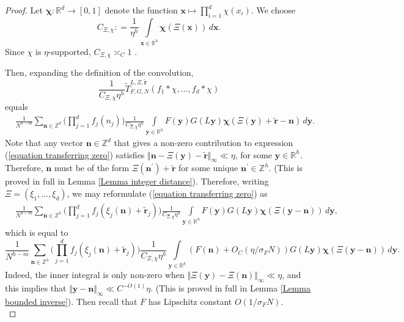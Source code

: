 \documentclass[12pt,a4paper,twoside,reqno]{amsart}
\newcommand{\bc}{\boldsymbol{\chi}}
\numberwithin{equation}{section}
\begin{document}
\begin{proof}
Let $\boldsymbol{\chi}:\mathbb{R}^d \longrightarrow [0,1]$ denote the function $\mathbf{x}\mapsto \prod\limits_{i=1}^d \chi(x_i)$. We choose \[ C_{\Xi,\chi} : = \frac{1}{\eta^h}\int\limits_{\mathbf{x} \in \mathbb{R}^h} \bc(\Xi(\mathbf{x})) \, d\mathbf{x} .\] Since $\chi$ is $\eta$-supported, $C_{\Xi,\chi} \asymp_C 1$ . 

Then, expanding the definition of the convolution, \[\frac{1}{C_{\Xi,\chi}\eta^{h}}\widetilde{T}_{F,G,N}^{L,\Xi,\widetilde{\mathbf{r}}}(f_1\ast \chi,\dots,f_d\ast \chi)\] equals
\begin{align}
\label{equation transferring zero}
&\frac{1}{N^{h-m}}\sum\limits_{\mathbf{n}\in \mathbb{Z}^d}\Big(\prod\limits_{j=1}^d f_j(n_j)\Big) \frac{1}{C_{\Xi,\chi}\eta^h} \int\limits_{\mathbf{y}\in \mathbb{R}^h} F(\mathbf{y}) G(L\mathbf{y}) \boldsymbol{\chi}(\Xi(\mathbf{y})  + \widetilde{\mathbf{r}} - \mathbf{n}) \, d\mathbf{y}. 
\end{align}
Note that any vector $\mathbf{n} \in \mathbb{Z}^d$ that gives a non-zero contribution to expression (\ref{equation transferring zero}) satisfies $\Vert \mathbf{n} - \Xi(\mathbf{y}) - \widetilde{\mathbf{r}}\Vert_\infty \ll \eta$, for some $\mathbf{y} \in \mathbb{R}^h$. Therefore, $\mathbf{n}$ must be of the form $\Xi(\mathbf{n^\prime}) + \widetilde{\mathbf{r}}$ for some unique $\mathbf{n^\prime} \in\mathbb{Z}^h$. (This is proved in full in Lemma \ref{Lemma integer distance}). Therefore, writing $\Xi = (\xi_1,\dots,\xi_d)$, we may reformulate (\ref{equation transferring zero}) as
\begin{align}
&\frac{1}{N^{h-m}}\sum\limits_{\mathbf{n}\in \mathbb{Z}^h} \Big(\prod\limits_{j=1}^d f_j(\xi_j(\mathbf{n}) + \widetilde{\mathbf{r}}_j)\Big) \frac{1}{C_{\Xi,\chi}\eta^h}\int\limits_{\mathbf{y}\in \mathbb{R}^h} F(\mathbf{y}) G(L\mathbf{y}) \boldsymbol{\chi}(\Xi(\mathbf{y}-\mathbf{n}))\, d\mathbf{y},\nonumber
\end{align}
\noindent which is equal to 
\begin{equation}
\label{extra equation to be referenced in transfer argument}
\frac{1}{N^{h-m}}\sum\limits_{\mathbf{n}\in \mathbb{Z}^h} \Big(\prod\limits_{j=1}^d f_j(\xi_j(\mathbf{n}) + \widetilde{\mathbf{r}}_j)\Big) \frac{1}{C_{\Xi,\chi}\eta^h}\int\limits_{\mathbf{y}\in \mathbb{R}^h}  (F(\mathbf{n}) + O_C(\eta/\sigma_F N))G(L\mathbf{y}) \boldsymbol{\chi}(\Xi(\mathbf{y} - \mathbf{n})) \, d\mathbf{y}.
\end{equation}
Indeed, the inner integral is only non-zero when  $\Vert \Xi(\mathbf{y}) - \Xi(\mathbf{n})\Vert_\infty\ll\eta$, and this implies that $\Vert \mathbf{y} - \mathbf{n}\Vert_\infty \ll C^{-O(1)} \eta$. (This is proved in full in Lemma \ref{Lemma bounded inverse}). Then recall that $F$ has Lipschitz constant $O(1/\sigma_F N)$.\\


\end{proof}
\end{document}

